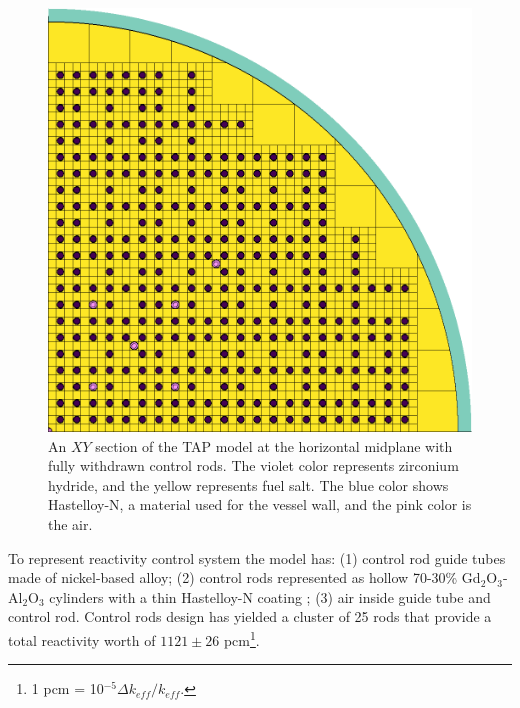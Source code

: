 \documentclass{anstrans}
\begin{document}
\begin{figure}[htp!] %
	\centering
	\includegraphics[width=\linewidth]{tap_plan_view.png}
	\caption{An $XY$ section of the \gls{TAP} model at the horizontal midplane 
		with fully withdrawn control rods. The violet color represents 
		zirconium hydride, and the yellow represents fuel salt. The blue color 
		shows Hastelloy-N, a material used for the vessel wall, and the pink 
		color is the air.}
	\label{fig:tap-serpent-plan}
\end{figure}

To represent reactivity control system the 
model has: (1) control rod guide tubes made of nickel-based alloy; (2) control 
rods represented as hollow 70-30\% Gd$_2$O$_3$-Al$_2$O$_3$ cylinders with a 
thin Hastelloy-N coating \cite{betzler_assessment_2017}; (3) air inside guide 
tube and control rod. Control rods design has yielded a cluster of 25 rods 
that provide a total reactivity worth of $1121\pm26$ pcm\footnote{ 1 pcm = 
10$^{-5}\Delta k_{eff}/k_{eff}$.}.
\end{document}
